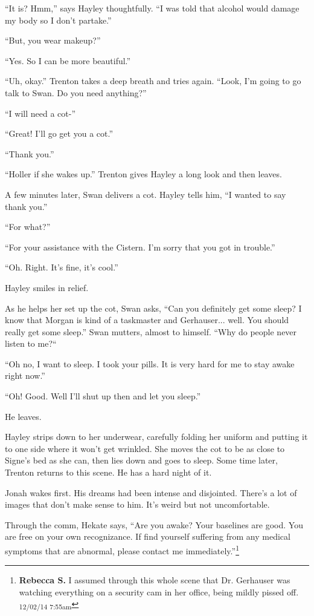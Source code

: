 ``It is?  Hmm,'' says Hayley thoughtfully.  ``I was told that alcohol would damage my body so I don't partake.''

``But, you wear makeup?''

``Yes. So I can be more beautiful.''

``Uh, okay.'' Trenton takes a deep breath and tries again.  ``Look, I'm going to go talk to Swan.  Do you need anything?''

``I will need a cot-''

``Great!  I'll go get you a cot.''

``Thank you.''

``Holler if she wakes up.''  Trenton gives Hayley a long look and then leaves.



A few minutes later, Swan delivers a cot.  Hayley tells him, ``I wanted to say thank you.''

``For what?''

``For your assistance with the Cistern.  I'm sorry that you got in trouble.''

``Oh. Right.  It's fine, it's cool.''

Hayley smiles in relief.

As he helps her set up the cot, Swan asks, ``Can you definitely get some sleep?  I know that Morgan is kind of a taskmaster and Gerhauser... well.  You should really get some sleep.''  Swan mutters, almost to himself.  ``Why do people never listen to me?``

``Oh no, I want to sleep. I took your pills.  It is very hard for me to stay awake right now.''

``Oh!  Good.  Well I'll shut up then and let you sleep.''

He leaves.

Hayley strips down to her underwear, carefully folding her uniform and putting it to one side where it won't get wrinkled.  She moves the cot to be as close to Signe's bed as she can, then lies down and goes to sleep.  Some time later, Trenton returns to this scene.  He has a hard night of it.





Jonah wakes first.  His dreams had been intense and disjointed. There's a lot of images that don't make sense to him.  It's weird but not uncomfortable.  

Through the comm, Hekate says, ``Are you awake?  Your baselines are good.  You are free on your own recognizance.  If find yourself suffering from any medical symptoms that are abnormal, please contact me immediately.''\footnote{\textbf{Rebecca S. }I assumed through this whole scene that Dr. Gerhauser was watching everything on a security cam in her office, being mildly pissed off. \textsubscript{12/02/14 7:55am}}

